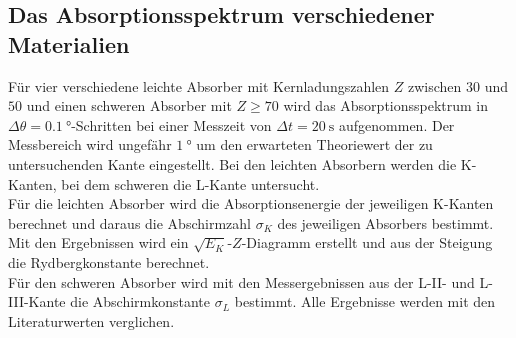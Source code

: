 \subsection{Das Absorptionsspektrum verschiedener Materialien}

Für vier verschiedene leichte Absorber mit Kernladungszahlen $Z$ zwischen $30$ und $50$ und einen schweren Absorber mit $Z \geq 70$ wird das Absorptionsspektrum in $\Delta\theta=\SI{0.1}{\degree}$-Schritten bei einer Messzeit von $\Delta t=\SI{20}{\second}$ aufgenommen. Der Messbereich wird ungefähr $\SI{1}{\degree}$ um den erwarteten Theoriewert der zu untersuchenden Kante eingestellt. Bei den leichten Absorbern werden die K-Kanten, bei dem schweren die L-Kante untersucht.\\
Für die leichten Absorber wird die Absorptionsenergie der jeweiligen K-Kanten berechnet und daraus die Abschirmzahl $\sigma_K$ des jeweiligen Absorbers bestimmt. Mit den Ergebnissen wird ein $\sqrt{E_K}$-$Z$-Diagramm erstellt und aus der Steigung die Rydbergkonstante berechnet.\\
Für den schweren Absorber wird mit den Messergebnissen aus der L-II- und L-III-Kante die Abschirmkonstante $\sigma_L$ bestimmt.
Alle Ergebnisse werden mit den Literaturwerten verglichen.